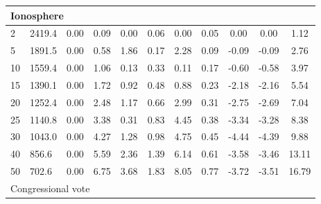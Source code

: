 {\begin{longtable}{@{}llccccccccc@{}}
\multicolumn{11}{l}{Ionosphere}                                                                                                                                                                       \\ \hline
\multicolumn{1}{l|}{2}  & \multicolumn{1}{l|}{2419.4}     & 0.00 & \multicolumn{1}{c|}{0.09}  & 0.00  & \multicolumn{1}{c|}{0.06} & 0.00  & \multicolumn{1}{c|}{0.05} & 0.00      & 0.00      & 1.12  \\
\multicolumn{1}{l|}{5}  & \multicolumn{1}{l|}{1891.5}     & 0.00 & \multicolumn{1}{c|}{0.58}  & 1.86  & \multicolumn{1}{c|}{0.17} & 2.28  & \multicolumn{1}{c|}{0.09} & -0.09     & -0.09     & 2.76  \\
\multicolumn{1}{l|}{10} & \multicolumn{1}{l|}{1559.4}     & 0.00 & \multicolumn{1}{c|}{1.06}  & 0.13  & \multicolumn{1}{c|}{0.33} & 0.11  & \multicolumn{1}{c|}{0.17} & -0.60     & -0.58     & 3.97  \\
\multicolumn{1}{l|}{15} & \multicolumn{1}{l|}{1390.1}     & 0.00 & \multicolumn{1}{c|}{1.72}  & 0.92  & \multicolumn{1}{c|}{0.48} & 0.88  & \multicolumn{1}{c|}{0.23} & -2.18     & -2.16     & 5.54  \\
\multicolumn{1}{l|}{20} & \multicolumn{1}{l|}{1252.4}     & 0.00 & \multicolumn{1}{c|}{2.48}  & 1.17  & \multicolumn{1}{c|}{0.66} & 2.99  & \multicolumn{1}{c|}{0.31} & -2.75     & -2.69     & 7.04  \\
\multicolumn{1}{l|}{25} & \multicolumn{1}{l|}{1140.8}     & 0.00 & \multicolumn{1}{c|}{3.38}  & 0.31  & \multicolumn{1}{c|}{0.83} & 4.45  & \multicolumn{1}{c|}{0.38} & -3.34     & -3.28     & 8.38  \\
\multicolumn{1}{l|}{30} & \multicolumn{1}{l|}{1043.0}     & 0.00 & \multicolumn{1}{c|}{4.27}  & 1.28  & \multicolumn{1}{c|}{0.98} & 4.75  & \multicolumn{1}{c|}{0.45} & -4.44     & -4.39     & 9.88  \\
\multicolumn{1}{l|}{40} & \multicolumn{1}{l|}{856.6}      & 0.00 & \multicolumn{1}{c|}{5.59}  & 2.36  & \multicolumn{1}{c|}{1.39} & 6.14  & \multicolumn{1}{c|}{0.61} & -3.58     & -3.46     & 13.11 \\
\multicolumn{1}{l|}{50} & \multicolumn{1}{l|}{702.6}      & 0.00 & \multicolumn{1}{c|}{6.75}  & 3.68  & \multicolumn{1}{c|}{1.83} & 8.05  & \multicolumn{1}{c|}{0.77} & -3.72     & -3.51     & 16.79 \\ \hline
\multicolumn{11}{l}{Congressional vote}                                                                                                                                                               \\ \hline

\end{longtable}}
